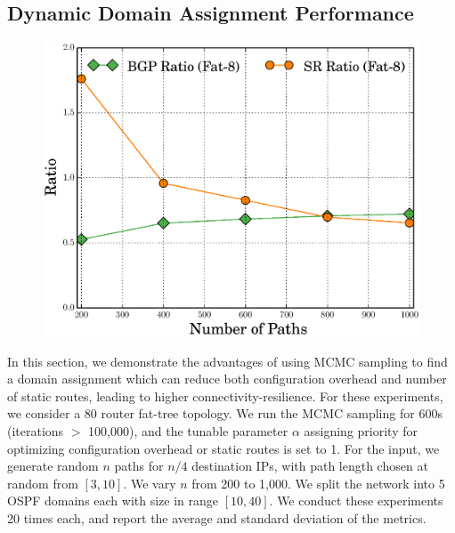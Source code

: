 \subsection{Dynamic Domain Assignment Performance} \label{sec:mcmceval}
\begin{figure}
	\includegraphics[width=0.33\columnwidth]{figures/ratioMCMC.eps}
\end{figure}

In this section, we demonstrate the advantages of using MCMC sampling
to find a domain assignment which can  
reduce both configuration overhead and number of static routes, 
leading to higher connectivity-resilience. 
For these experiments,
we consider a
80 router fat-tree topology. 
We run the MCMC sampling for 600s
(iterations $>$ 100,000), 
and the tunable parameter $\alpha$ assigning
priority for optimizing configuration 
overhead or static routes is set
to 1. For the input, we generate 
random $n$ paths for $n/4$
destination IPs, with path
 length chosen at random from $[3,10]$. 
We vary $n$ from 200 to 1,000.
We
split the network into 5 OSPF domains 
each with size in range $[10,40]$. We
conduct these experiments 20 times each, 
and report the average and
standard deviation of the metrics.

